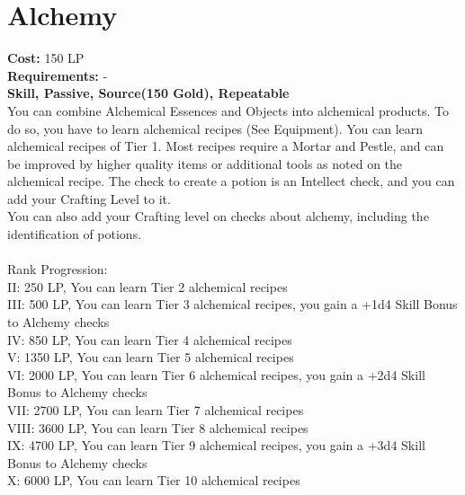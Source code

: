 \section{Alchemy}\label{perk:alchemy}
\textbf{Cost:} 150 LP\\
\textbf{Requirements:} -\\
\textbf{Skill, Passive, Source(150 Gold), Repeatable}\\
You can combine Alchemical Essences and Objects into alchemical products.
To do so, you have to learn alchemical recipes (See Equipment).
You can learn alchemical recipes of Tier 1.
Most recipes require a Mortar and Pestle, and can be improved by higher quality items or additional tools as noted on the alchemical recipe.
The check to create a potion is an Intellect check, and you can add your Crafting Level to it.\\
You can also add your Crafting level on checks about alchemy, including the identification of potions.\\
\\
Rank Progression:\\
II: 250 LP, You can learn Tier 2 alchemical recipes\\
III: 500 LP, You can learn Tier 3 alchemical recipes, you gain a +1d4 Skill Bonus to Alchemy checks\\
IV: 850 LP, You can learn Tier 4 alchemical recipes\\
V: 1350 LP, You can learn Tier 5 alchemical recipes\\
VI: 2000 LP, You can learn Tier 6 alchemical recipes, you gain a +2d4 Skill Bonus to Alchemy checks\\
VII: 2700 LP, You can learn Tier 7 alchemical recipes\\
VIII: 3600 LP, You can learn Tier 8 alchemical recipes\\
IX: 4700 LP, You can learn Tier 9 alchemical recipes, you gain a +3d4 Skill Bonus to Alchemy checks\\
X: 6000 LP, You can learn Tier 10 alchemical recipes\\